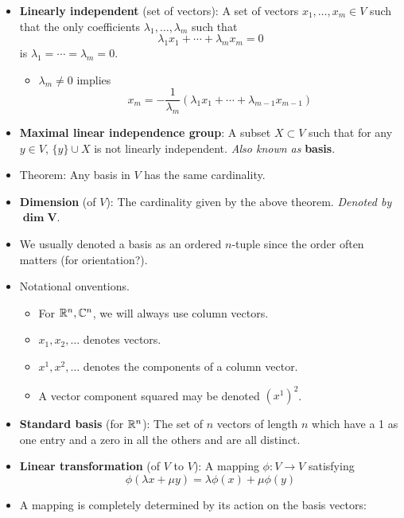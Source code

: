 \documentclass[../notes.tex]{subfiles}
\begin{document}
\begin{itemize}
    \item \textbf{Linearly independent} (set of vectors): A set of vectors $x_1,\dots,x_m\in V$ such that the only coefficients $\lambda_1,\dots,\lambda_m$ such that
    \begin{equation*}
        \lambda_1x_1+\cdots+\lambda_mx_m = 0
    \end{equation*}
    is $\lambda_1=\cdots=\lambda_m=0$.
    \begin{itemize}
        \item $\lambda_m\neq 0$ implies
        \begin{equation*}
            x_m = -\frac{1}{\lambda_m}(\lambda_1x_1+\cdots+\lambda_{m-1}x_{m-1})
        \end{equation*}
    \end{itemize}
    \item \textbf{Maximal linear independence group}: A subset $X\subset V$ such that for any $y\in V$, $\{y\}\cup X$ is not linearly independent. \emph{Also known as} \textbf{basis}.
    \item Theorem: Any basis in $V$ has the same cardinality.
    \item \textbf{Dimension} (of $V$): The cardinality given by the above theorem. \emph{Denoted by} $\bm{\dim V}$.
    \item We usually denoted a basis as an ordered $n$-tuple since the order often matters (for orientation?).
    \item Notational onventions.
    \begin{itemize}
        \item For $\mathbb{R}^n,\mathbb{C}^n$, we will always use column vectors.
        \item $x_1,x_2,\dots$ denotes vectors.
        \item $x^1,x^2,\dots$ denotes the components of a column vector.
        \item A vector component squared may be denoted $(x^1)^2$.
    \end{itemize}
    \item \textbf{Standard basis} (for $\mathbb{R}^n$): The set of $n$ vectors of length $n$ which have a 1 as one entry and a zero in all the others and are all distinct.
    \item \textbf{Linear transformation} (of $V$ to $V$): A mapping $\phi:V\to V$ satisfying
    \begin{equation*}
        \phi(\lambda x+\mu y) = \lambda\phi(x)+\mu\phi(y)
    \end{equation*}
    \item A mapping is completely determined by its action on the basis vectors:

\end{itemize}
\end{document}
